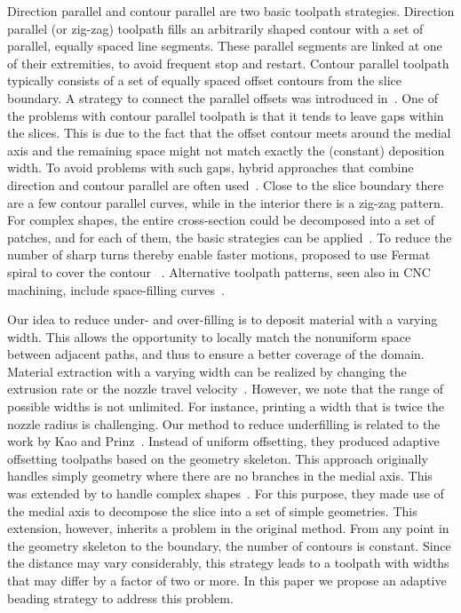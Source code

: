 Direction parallel and contour parallel are two basic toolpath strategies.
Direction parallel (or zig-zag) toolpath fills an arbitrarily shaped contour with a set of parallel, equally spaced line segments.
These parallel segments are linked at one of their extremities, to avoid frequent stop and restart.
Contour parallel toolpath typically consists of a set of equally spaced offset contours from the slice boundary.
A strategy to connect the parallel offsets was introduced in~\cite{KUIPERS2019CAD}.
One of the problems with contour parallel toolpath is that it tends to leave gaps within the slices.
This is due to the fact that the offset contour meets around the medial axis and the remaining space might not match exactly the (constant) deposition width.
To avoid problems with such gaps, hybrid approaches that combine direction and contour parallel are often used~\cite{Mcmains2000DETC,Jin2013adaptive}.
Close to the slice boundary there are a few contour parallel curves, while in the interior there is a zig-zag pattern.
For complex shapes, the entire cross-section could be decomposed into a set of patches, and for each of them, the basic strategies can be applied~\cite{Ding2014}.
To reduce the number of sharp turns thereby enable faster motions, \citeauthor{Zhao2016} proposed to use Fermat spiral to cover the contour ~\cite{Zhao2016}.
Alternative toolpath patterns, seen also in CNC machining, include space-filling curves~\cite{Cox1994CAD,Griffiths1994,Shaikh2016}.

Our idea to reduce under- and over-filling is to deposit material with a varying width.
This allows the opportunity to locally match the nonuniform space between adjacent paths, and thus to ensure a better coverage of the domain.
Material extraction with a varying width can be realized by changing the extrusion rate or the nozzle travel velocity~\cite{Ertay2018}.
However, we note that the range of possible widths is not unlimited. For instance, printing a width that is twice the nozzle radius is challenging.
Our method to reduce underfilling is related to the work by Kao and Prinz~\cite{kao1998optimal}.
Instead of uniform offsetting, they produced adaptive offsetting toolpaths based on the geometry skeleton.
This approach originally handles simply geometry where there are no branches in the medial axis.
This was extended by \citeauthor{Ding2016a} to handle complex shapes~\cite{Ding2016a}.
For this purpose, they made use of the medial axis to decompose the slice into a set of simple geometries.
This extension, however, inherits a problem in the original method.
From any point in the geometry skeleton to the boundary, the number of contours is constant.
Since the distance may vary considerably, this strategy leads to a toolpath with widths that may differ by a factor of two or more.
In this paper we propose an adaptive beading strategy to address this problem.


